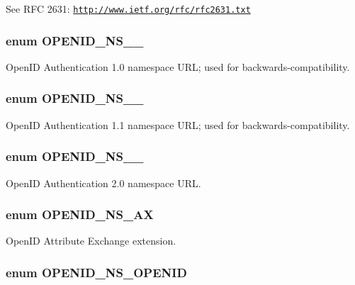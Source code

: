 See RFC 2631: \href{http://www.ietf.org/rfc/rfc2631.txt}{\tt http://www.ietf.org/rfc/rfc2631.txt} \hypertarget{openid_8inc_af6b34e60d425751680d476ff554909b4}{
\subsubsection[{OPENID\_\-NS\_\-1\_\-0}]{\setlength{\rightskip}{0pt plus 5cm}enum {\bf OPENID\_\-NS\_\_}}}
\label{openid_8inc_af6b34e60d425751680d476ff554909b4}
OpenID Authentication 1.0 namespace URL; used for backwards-\/compatibility. \hypertarget{openid_8inc_a611ef47dbc81955be33a9257739e491e}{
\subsubsection[{OPENID\_\-NS\_\-1\_\-1}]{\setlength{\rightskip}{0pt plus 5cm}enum {\bf OPENID\_\-NS\_\_}}}
\label{openid_8inc_a611ef47dbc81955be33a9257739e491e}
OpenID Authentication 1.1 namespace URL; used for backwards-\/compatibility. \hypertarget{openid_8inc_a397c64482f92c89ab6e7d6e055130403}{
\subsubsection[{OPENID\_\-NS\_\-2\_\-0}]{\setlength{\rightskip}{0pt plus 5cm}enum {\bf OPENID\_\-NS\_\_}}}
\label{openid_8inc_a397c64482f92c89ab6e7d6e055130403}
OpenID Authentication 2.0 namespace URL. \hypertarget{openid_8inc_ad145db85315144baf406667a1e7c5959}{
\subsubsection[{OPENID\_\-NS\_\-AX}]{\setlength{\rightskip}{0pt plus 5cm}enum {\bf OPENID\_\-NS\_\-AX}}}
\label{openid_8inc_ad145db85315144baf406667a1e7c5959}
OpenID Attribute Exchange extension. \hypertarget{openid_8inc_aea9824c9d4564d018bcf5bf47efd6b15}{
\subsubsection[{OPENID\_\-NS\_\-OPENID}]{\setlength{\rightskip}{0pt plus 5cm}enum {\bf OPENID\_\-NS\_\-OPENID}}}
